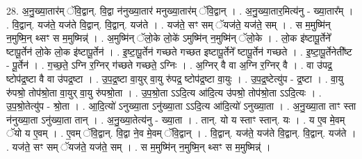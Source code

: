 \documentclass[17pt]{extarticle}
\begin{document}
28. अ॒नु॒ख्या॒तार॑म् ॅवि॒द्वान्. वि॒द्वा न॑नुख्या॒तार॑ मनुख्या॒तार॑म् ॅवि॒द्वान् । . अ॒नु॒ख्या॒तार॒मित्य॑नु - ख्या॒तार᳚म् । . वि॒द्वान्. यज॑ते॒ यज॑ते वि॒द्वान्. वि॒द्वान्. यज॑ते । . यज॑ते॒ सꣳ सम् ॅयज॑ते॒ यज॑ते॒ सम् । . स म॒मुष्मि॑न् न॒मुष्मि॒न् थ्सꣳ स म॒मुष्मिन्न्॑ । . अ॒मुष्मि॑न् ॅलो॒के लो॒के॑ ऽमुष्मि॑न् न॒मुष्मि॑न् ॅलो॒के । . लो॒क इ॑ष्टापू॒र्तेने᳚ ष्टापू॒र्तेन॑ लो॒के लो॒क इ॑ष्टापू॒र्तेन॑ । . इ॒ष्टा॒पू॒र्तेन॑ गच्छते गच्छत इष्टापू॒र्तेने᳚ ष्टापू॒र्तेन॑ गच्छते । . इ॒ष्टा॒पू॒र्तेनेती᳚ष्ट - पू॒र्तेन॑ । . ग॒च्छ॒ते॒ ऽग्नि र॒ग्निर् ग॑च्छते गच्छते॒ ऽग्निः । . अ॒ग्निर् वै वा अ॒ग्नि र॒ग्निर् वै । . वा उ॑पद्र॒ ष्टोप॑द्र॒ष्टा वै वा उ॑पद्र॒ष्टा । . उ॒प॒द्र॒ष्टा वा॒युर् वा॒यु रु॑पद्र॒ ष्टोप॑द्र॒ष्टा वा॒युः । . उ॒प॒द्र॒ष्टेत्यु॑प - द्र॒ष्टा । . वा॒यु रु॑पश्रो॒ तोप॑श्रो॒ता वा॒युर् वा॒यु रु॑पश्रो॒ता । . उ॒प॒श्रो॒ता ऽऽदि॒त्य आ॑दि॒त्य उ॑पश्रो॒ तोप॑श्रो॒ता ऽऽदि॒त्यः । . उ॒प॒श्रो॒तेत्यु॑प - श्रो॒ता । . आ॒दि॒त्यो॑ ऽनुख्या॒ता ऽनु॑ख्या॒ता ऽऽदि॒त्य आ॑दि॒त्यो॑ ऽनुख्या॒ता । . अ॒नु॒ख्या॒ता ताꣳ स्ता न॑नुख्या॒ता ऽनु॑ख्या॒ता तान् । . अ॒नु॒ख्या॒तेत्य॑नु - ख्या॒ता । . तान्. यो य स्ताꣳ स्तान्. यः । . य ए॒व मे॒वम् ॅयो य ए॒वम् । . ए॒वम् ॅवि॒द्वान्. वि॒द्वा ने॒व मे॒वम् ॅवि॒द्वान् । . वि॒द्वान्. यज॑ते॒ यज॑ते वि॒द्वान्. वि॒द्वान्. यज॑ते । . यज॑ते॒ सꣳ सम् ॅयज॑ते॒ यज॑ते॒ सम् । . स म॒मुष्मि॑न् न॒मुष्मि॒न् थ्सꣳ स म॒मुष्मिन्न्॑ । \newline
\end{document}
